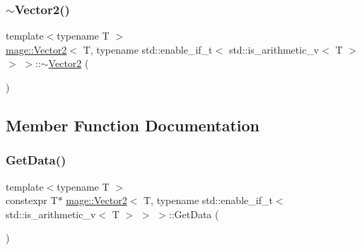 \subsubsection{\texorpdfstring{$\sim$\+Vector2()}{~Vector2()}}
{\footnotesize\ttfamily template$<$typename T $>$ \\
\hyperlink{structmage_1_1_vector2}{mage\+::\+Vector2}$<$ T, typename std\+::enable\+\_\+if\+\_\+t$<$ std\+::is\+\_\+arithmetic\+\_\+v$<$ T $>$ $>$ $>$\+::$\sim$\hyperlink{structmage_1_1_vector2}{Vector2} (\begin{DoxyParamCaption}{ }\end{DoxyParamCaption})\hspace{0.3cm}{\ttfamily [default]}}



\subsection{Member Function Documentation}
\hypertarget{structmage_1_1_vector2_3_01_t_00_01typename_01std_1_1enable__if__t_3_01std_1_1is__arithmetic__v_3_01_t_01_4_01_4_01_4_a532ee64d7de5e64d82ef95242e67f705}{}\label{structmage_1_1_vector2_3_01_t_00_01typename_01std_1_1enable__if__t_3_01std_1_1is__arithmetic__v_3_01_t_01_4_01_4_01_4_a532ee64d7de5e64d82ef95242e67f705} 
\subsubsection{\texorpdfstring{Get\+Data()}{GetData()}\hspace{0.1cm}{\footnotesize\ttfamily [1/2]}}
{\footnotesize\ttfamily template$<$typename T $>$ \\
constexpr T$\ast$ \hyperlink{structmage_1_1_vector2}{mage\+::\+Vector2}$<$ T, typename std\+::enable\+\_\+if\+\_\+t$<$ std\+::is\+\_\+arithmetic\+\_\+v$<$ T $>$ $>$ $>$\+::Get\+Data (\begin{DoxyParamCaption}{ }\end{DoxyParamCaption})\hspace{0.3cm}{\ttfamily [noexcept]}}

